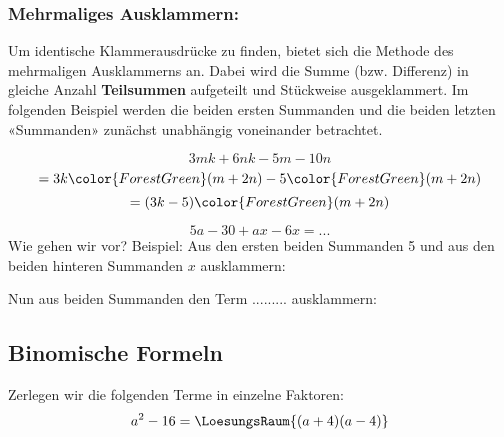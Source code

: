 \newpage



\subsubsection{Mehrmaliges Ausklammern:}
 Um identische Klammerausdrücke zu finden, bietet sich die Methode des mehrmaligen Ausklammerns an.
 Dabei wird die Summe (bzw. Differenz) in gleiche Anzahl \textbf{Teilsummen} aufgeteilt und Stückweise ausgeklammert.
 Im folgenden Beispiel werden die beiden ersten Summanden und die beiden letzten «Summanden» zunächst unabhängig voneinander betrachtet.

$$3mk+6nk-5m-10n $$
$$= 3k{\color{ForestGreen}(m+2n)}-5{\color{ForestGreen}(m+2n)} $$
$$= (3k-5){\color{ForestGreen}(m+2n)}$$


\begin{beispiel}{}{}
  $$5a-30+ax-6x = ...$$
  Wie gehen wir vor? Beispiel: Aus den ersten beiden Summanden 5 und
  aus den beiden hinteren Summanden $x$ ausklammern:


  Nun aus beiden Summanden den Term ......... 
  ausklammern:

\end{beispiel}



\newpage


\subsection{Binomische Formeln}%



Zerlegen wir die folgenden Terme in einzelne Faktoren:
$$ a^2 - 16 = \LoesungsRaum{(a+4)(a-4)} $$

